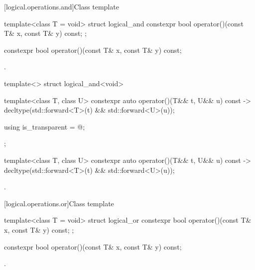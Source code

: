 [logical.operations.and]{Class template }

%
\begin{itemdecl}
template<class T = void> struct logical_and {
  constexpr bool operator()(const T& x, const T& y) const;
};
\end{itemdecl}

%
\begin{itemdecl}
constexpr bool operator()(const T& x, const T& y) const;
\end{itemdecl}

\begin{itemdescr}
\pnum\returns {}.
\end{itemdescr}

%
\begin{itemdecl}
template<> struct logical_and<void> {
  template<class T, class U> constexpr auto operator()(T&& t, U&& u) const
    -> decltype(std::forward<T>(t) && std::forward<U>(u));

  using is_transparent = @\unspec@;
};
\end{itemdecl}

%
\begin{itemdecl}
template<class T, class U> constexpr auto operator()(T&& t, U&& u) const
    -> decltype(std::forward<T>(t) && std::forward<U>(u));
\end{itemdecl}

\begin{itemdescr}
\pnum\returns {}.
\end{itemdescr}

[logical.operations.or]{Class template }

%
\begin{itemdecl}
template<class T = void> struct logical_or {
  constexpr bool operator()(const T& x, const T& y) const;
};
\end{itemdecl}

%
\begin{itemdecl}
constexpr bool operator()(const T& x, const T& y) const;
\end{itemdecl}

\begin{itemdescr}
\pnum\returns {}.
\end{itemdescr}

